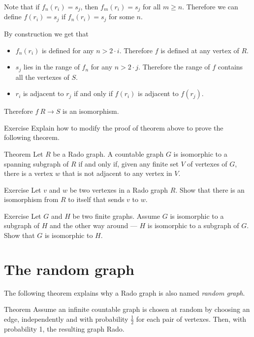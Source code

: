 Note that if $f_n(r_i)=s_j$, then $f_m(r_i)=s_j$ for all $m\ge n$.
Therefore we can define $f(r_i)=s_j$ if $f_n(r_i)=s_j$ for some $n$.


By construction we get that 
\begin{itemize}
\item $f_n(r_i)$ is defined for any $n>2\cdot i$. Therefore $f$ is defined at any vertex of $R$.
\item $s_j$ lies in the range of $f_n$ for any $n>2\cdot j$.
Therefore the range of $f$ contains all the vertexes of $S$.
\item $r_i$ is adjacent to $r_j$ if and only if $f(r_i)$ is adjacent to $f(r_j)$.
\end{itemize}
Therefore $f\:R\to S$ is an isomorphism.
\qeds

\begin{thm}{Exercise}
Explain how to modify the proof of theorem above to prove the following theorem.
\end{thm}


\begin{thm}{Theorem}
Let $R$ be a Rado graph.
A countable graph $G$ is isomorphic to a spanning subgraph of $R$ if and only if, given any finite set $V$ of vertexes of $G$, there is a vertex $w$ that is not adjacent to any vertex in $V$.
\end{thm}

\begin{thm}{Exercise}
Let $v$ and $w$ be two vertexes in a Rado graph $R$.
Show that there is an isomorphism from $R$ to itself that sends $v$ to $w$.
\end{thm}

\begin{thm}{Exercise}\label{ex:finite-subgraphs}
Let $G$ and $H$ be two finite graphs.
Assume $G$ is isomorphic to a subgraph of $H$ 
and the other way around --- $H$ is isomorphic to a subgraph of $G$.
Show that $G$ is isomorphic to $H$.
\end{thm}


\section*{The random graph}

The following theorem explains why a Rado graph is also named {}\emph{random graph}.

\begin{thm}{Theorem}\label{thm:the-random-graph}
Assume an infinite countable graph is chosen at random 
by choosing an edge, independently and with probability $\tfrac12$ for each pair of vertexes.
Then, with probability 1, the resulting graph Rado.
\end{thm}

